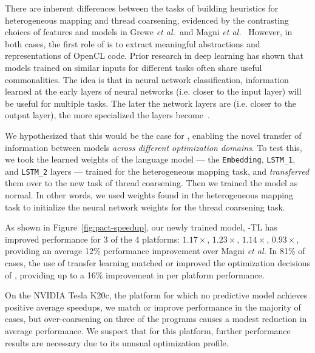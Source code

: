There are inherent differences between the tasks of building heuristics for heterogeneous mapping and thread coarsening, evidenced by the contrasting choices of features and models in Grewe \emph{et al.\ }and Magni \emph{et al.\ } However, in both cases, the first role of \DeepTune is to extract meaningful abstractions and representations of OpenCL code. Prior research in deep learning has shown that models trained on similar inputs for different tasks often share useful commonalities. The idea is that in neural network classification, information learned at the early layers of neural networks (i.e. closer to the input layer) will be useful for multiple tasks. The later the network layers are (i.e. closer to the output layer), the more specialized the layers become~\cite{Zeiler2014}.

We hypothesized that this would be the case for \DeepTune, enabling the novel transfer of information between models \emph{across different optimization domains}. To test this, we took the learned weights of the language model --- the \texttt{Embedding}, \texttt{LSTM\_1}, and \texttt{LSTM\_2} layers --- trained for the heterogeneous mapping task, and \emph{transferred} them over to the new task of thread coarsening. Then we trained the model as normal.
In other words, we used weights found in the heterogeneous mapping task to initialize the neural network weights for the thread coarsening task.


As shown in Figure~\ref{fig:pact-speedup}, our newly trained model, \DeepTune-TL has improved performance for 3 of the 4 platforms: $1.17\times$, $1.23\times$, $1.14\times$, $0.93\times$, providing an average 12\% performance improvement over Magni \emph{et al.}  In 81\% of cases, the use of transfer learning matched or improved the optimization decisions of \DeepTune, providing up to a 16\% improvement in per platform performance.

On the NVIDIA Tesla K20c, the platform for which no predictive model achieves positive average speedups, we match or improve performance in the majority of cases, but over-coarsening on three of the programs causes a modest reduction in average performance. We suspect that for this platform, further performance results are necessary due to its unusual optimization profile.


